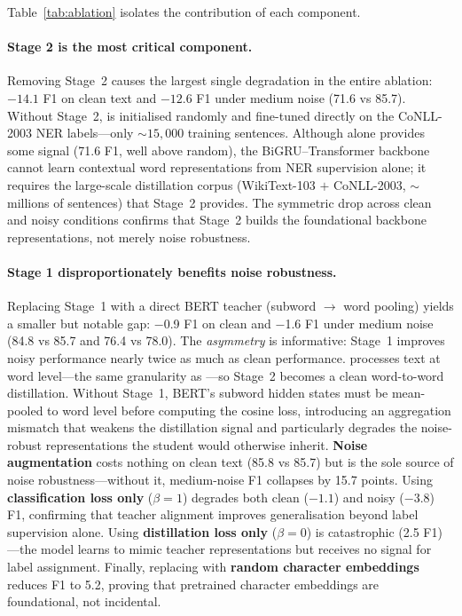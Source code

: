 Table~\ref{tab:ablation} isolates the contribution of each component.

\paragraph{Stage 2 is the most critical component.}
Removing Stage~2 causes the largest single degradation in the entire ablation:
$-14.1$ F1 on clean text and $-12.6$ F1 under medium noise (71.6 vs 85.7).
Without Stage~2, \LightRet{} is initialised randomly and fine-tuned directly
on the CoNLL-2003 NER labels---only ${\sim}15{,}000$ training sentences.
Although \RetVec{} alone provides some signal (71.6 F1, well above random),
the BiGRU--Transformer backbone cannot learn contextual word representations
from NER supervision alone; it requires the large-scale distillation corpus
(WikiText-103 $+$ CoNLL-2003, ${\sim}$millions of sentences) that Stage~2 provides.
The symmetric drop across clean and noisy conditions confirms that Stage~2 builds
the foundational backbone representations, not merely noise robustness.

\paragraph{Stage 1 disproportionately benefits noise robustness.}
Replacing Stage~1 with a direct BERT teacher (subword $\to$ word pooling) yields
a smaller but notable gap: $-$0.9 F1 on clean and $-$1.6 F1 under medium noise
(84.8 vs 85.7 and 76.4 vs 78.0).
The \emph{asymmetry} is informative: Stage~1 improves noisy performance nearly
twice as much as clean performance.
\RetBERT{} processes text at word level---the same granularity as \LightRet{}---so
Stage~2 becomes a clean word-to-word distillation.
Without Stage~1, BERT's subword hidden states must be mean-pooled to word level
before computing the cosine loss, introducing an aggregation mismatch that weakens
the distillation signal and particularly degrades the noise-robust representations
the student would otherwise inherit.
\textbf{Noise augmentation} costs nothing on clean text (85.8 vs 85.7) but is the
sole source of noise robustness---without it, medium-noise F1 collapses by 15.7 points.
Using \textbf{classification loss only} ($\beta{=}1$) degrades both clean ($-1.1$) and
noisy ($-3.8$) F1, confirming that teacher alignment improves generalisation beyond
label supervision alone.
Using \textbf{distillation loss only} ($\beta{=}0$) is catastrophic (2.5 F1)---the
model learns to mimic teacher representations but receives no signal for label assignment.
Finally, replacing \RetVec{} with \textbf{random character embeddings} reduces F1
to 5.2, proving that pretrained character embeddings are foundational, not incidental.


